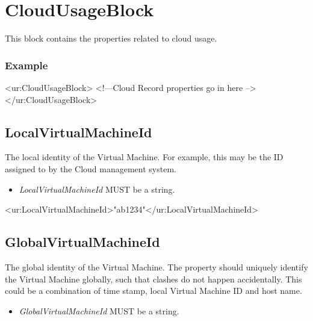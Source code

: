 
\section{CloudUsageBlock}

This block contains the properties related to cloud usage.

\subsubsection*{Example}
\begin{XMLexample}
<ur:CloudUsageBlock>
<!—Cloud Record properties go in here -->
</ur:CloudUsageBlock>
\end{XMLexample}






\subsection{LocalVirtualMachineId}

The local identity of the Virtual Machine. For example, this may be the ID assigned to by the Cloud management system.

\begin{itemize}
\item \emph{LocalVirtualMachineId} MUST be a string.
\end{itemize}

\begin{XMLexample}
<ur:LocalVirtualMachineId>"ab1234"</ur:LocalVirtualMachineId>
\end{XMLexample}






\subsection{GlobalVirtualMachineId}

The global identity of the Virtual Machine. The property should uniquely identify the Virtual Machine globally, such that clashes do not happen accidentally. This could be a combination of time stamp, local Virtual Machine ID and host name.

\begin{itemize}
\item \emph{GlobalVirtualMachineId} MUST be a string.
\end{itemize}

